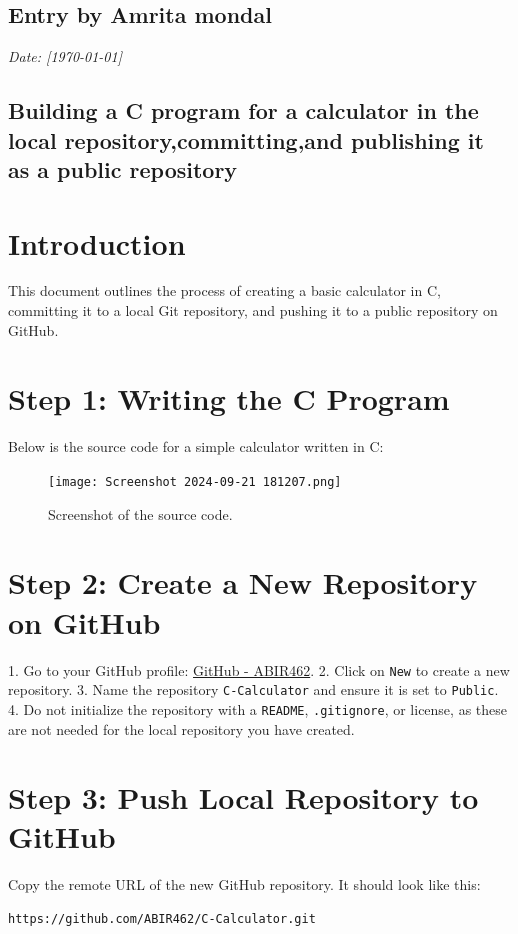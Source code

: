 \documentclass[a4paper,12pt]{article}
\begin{document}
\subsection*{Entry by Amrita mondal}
\textit{Date: [\today]}\\
\subsection{Building a C program for a calculator in the local
repository,committing,and publishing it as a public repository}
\section{Introduction}
This document outlines the process of creating a basic calculator in C, committing it to a local Git repository, and pushing it to a public repository on GitHub.
\section{Step 1: Writing the C Program}
Below is the source code for a simple calculator written in C:
\begin{figure}[h!]
    \centering
    \texttt{[image: Screenshot 2024-09-21 181207.png]} %
     \hspace{4 cm}
    \caption{Screenshot of the source code.}
\end{figure}
\section{Step 2: Create a New Repository on GitHub}

1. Go to your GitHub profile: \href{https://github.com/ABIR462}{GitHub - ABIR462}.
2. Click on \texttt{New} to create a new repository.
3. Name the repository \texttt{C-Calculator} and ensure it is set to \texttt{Public}.
4. Do not initialize the repository with a \texttt{README}, \texttt{.gitignore}, or license, as these are not needed for the local repository you have created.

\section{Step 3: Push Local Repository to GitHub}

Copy the remote URL of the new GitHub repository. It should look like this:
\begin{lstlisting}[caption={Example remote URL}]
https://github.com/ABIR462/C-Calculator.git
\end{lstlisting}
\end{document}
